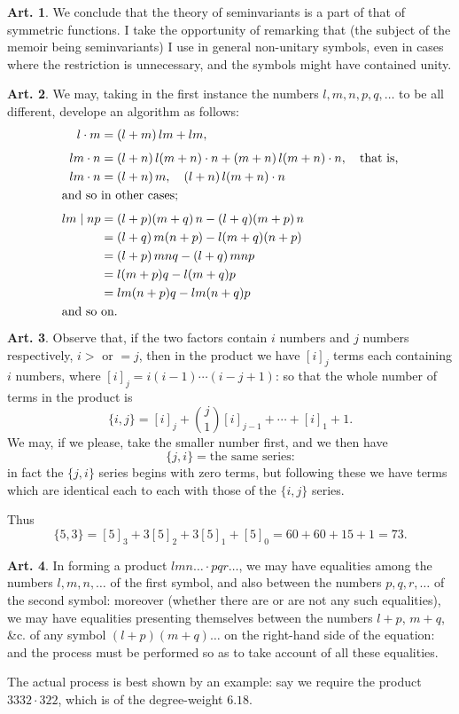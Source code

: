 \documentclass[11pt,a4paper]{article}
\theoremstyle{definition}
\newtheorem{art}{Art.}[section]
\begin{document}
\begin{art}
We conclude that the theory of seminvariants is a part of that of symmetric functions. I take the opportunity of remarking that (the subject of the memoir being seminvariants) I use in general non-unitary symbols, even in cases where the restriction is unnecessary, and the symbols might have contained unity.
\end{art}

\begin{art}
We may, taking in the first instance the numbers $l,m,n,p,q,\ldots$ to be all different, develope an algorithm as follows:
\begin{align*}
l \cdot m &= (l+m)\,lm + lm, \\[4pt]
lm \cdot n &= (l+n)\,l(m+n) \cdot n + (m+n)\,l(m+n) \cdot n, \quad \text{that is,} \\
lm \cdot n &= (l+n)\,m, \quad (l+n)\,l(m+n) \cdot n \\
\multicolumn{2}{l}{\text{and so in other cases;}} \\[4pt]
lm \mid np &= (l+p)(m+q)\,n - (l+q)(m+p)\,n \\
&= (l+q)\,m(n+p) - l(m+q)(n+p) \\
&= (l+p)\,mnq - (l+q)\,mnp \\
&= l(m+p)q - l(m+q)p \\
&= lm(n+p)q - lm(n+q)p \\
\multicolumn{2}{l}{\text{and so on.}}
\end{align*}
\end{art}

\begin{art}
Observe that, if the two factors contain $i$ numbers and $j$ numbers respectively, $i >$ or $=j$, then in the product we have $[i]_j$ terms each containing $i$ numbers, where $[i]_j = i(i-1)\cdots(i-j+1)$: so that the whole number of terms in the product is
\[
\{i,j\} = [i]_j + \binom{j}{1}[i]_{j-1} + \cdots + [i]_1 + 1.
\]
We may, if we please, take the smaller number first, and we then have
\[
\{j,i\} = \text{the same series:}
\]
in fact the $\{j,i\}$ series begins with zero terms, but following these we have terms which are identical each to each with those of the $\{i,j\}$ series.

Thus
\[
\{5,3\} = [5]_3 + 3[5]_2 + 3[5]_1 + [5]_0 = 60 + 60 + 15 + 1 = 73.
\]
\end{art}

\begin{art}
In forming a product $lmn\ldots \cdot pqr\ldots$, we may have equalities among the numbers $l,m,n,\ldots$ of the first symbol, and also between the numbers $p,q,r,\ldots$ of the second symbol: moreover (whether there are or are not any such equalities), we may have equalities presenting themselves between the numbers $l+p$, $m+q$, \&c. of any symbol $(l+p)(m+q)\ldots$ on the right-hand side of the equation: and the process must be performed so as to take account of all these equalities.

The actual process is best shown by an example: say we require the product $3332 \cdot 322$, which is of the degree-weight $6.18$.
\end{art}
\end{document}
